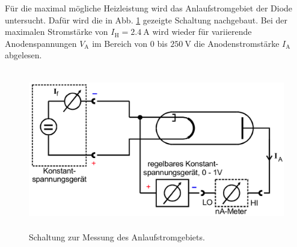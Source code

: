Für die maximal mögliche Heizleistung wird das 
Anlaufstromgebiet der Diode untersucht.
Dafür wird die in Abb. \ref{fig:c} gezeigte Schaltung
nachgebaut. Bei der maximalen Stromstärke von 
$I_\text{H} = \SI{2.4}{\ampere}$ wird wieder für variierende
Anodenspannungen $V_\text{A}$ im Bereich von $\num{0}$ bis
$\SI{250}{\volt}$ die Anodenstromstärke $I_\text{A}$ abgelesen.
\begin{figure}
    \centering
    \includegraphics[width=12cm, height=7cm]{build/c.png}
    \caption{Schaltung zur Messung des Anlaufstromgebiets. \cite{V504}}
    \label{fig:c}
\end{figure}




